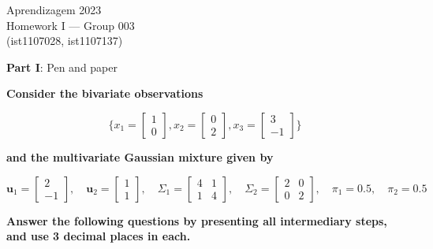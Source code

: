 \documentclass[12pt]{article}
\begin{document}
\begin{center}
Aprendizagem 2023\\
Homework I --- Group 003\\
(ist1107028, ist1107137)\vskip 1cm
\end{center}

\large{\textbf{Part I}: Pen and paper}\normalsize

\vspace{20pt}
\textbf{Consider the bivariate observations}

\begin{equation*}\{
    x_1 = \begin{bmatrix}
        1 \\
        0
    \end{bmatrix},
    x_2 = \begin{bmatrix}
        0 \\
        2
    \end{bmatrix},
    x_3 = \begin{bmatrix}
        3 \\
        -1
    \end{bmatrix}\}
\end{equation*}

\vspace{10pt}
\textbf{and the multivariate Gaussian mixture given by}

\[
\mathbf{u}_1 = \begin{bmatrix} 2 \\ -1 \end{bmatrix}, \quad
\mathbf{u}_2 = \begin{bmatrix} 1 \\ 1 \end{bmatrix}, \quad
\Sigma_1 = \begin{bmatrix} 4 & 1 \\ 1 & 4 \end{bmatrix}, \quad
\Sigma_2 = \begin{bmatrix} 2 & 0 \\ 0 & 2 \end{bmatrix}, \quad
\pi_1 = 0.5, \quad \pi_2 = 0.5
\]

\vspace{10pt}
\textbf{Answer the following questions by presenting all intermediary steps, and use 3 decimal places in
each.}
\end{document}
